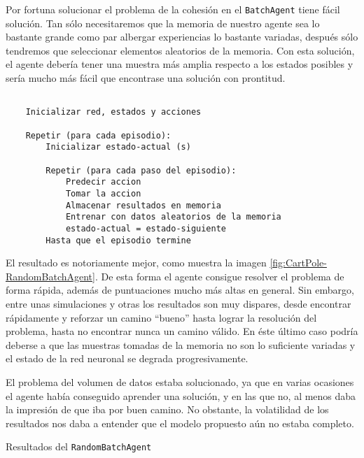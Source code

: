 Por fortuna solucionar el problema de la cohesión en el \texttt{BatchAgent} tiene fácil solución. Tan sólo necesitaremos que la memoria de nuestro agente sea lo bastante grande como par albergar experiencias lo bastante variadas, después sólo tendremos que seleccionar elementos aleatorios de la memoria. Con esta solución, el agente debería tener una muestra más amplia respecto a los estados posibles y sería mucho más fácil que encontrase una solución con prontitud.

\begin{minipage}{0.9\linewidth}%
    \begin{lstlisting}[frame=tb, caption=Pseudocódigo RandomBatchAgent, inputencoding=latin1, label=code:cartpole_drl3]
    
    Inicializar red, estados y acciones
    
    Repetir (para cada episodio):
        Inicializar estado-actual (s)
        
        Repetir (para cada paso del episodio):
            Predecir accion
            Tomar la accion
            Almacenar resultados en memoria
            Entrenar con datos aleatorios de la memoria
            estado-actual = estado-siguiente
        Hasta que el episodio termine
    \end{lstlisting}%
\end{minipage}

El resultado es notoriamente mejor, como muestra la imagen \ref{fig:CartPole-RandomBatchAgent}. De esta forma el agente consigue resolver el problema de forma rápida, además de puntuaciones mucho más altas en general. Sin embargo, entre unas simulaciones y otras los resultados son muy dispares, desde encontrar rápidamente y reforzar un camino ``bueno'' hasta lograr la resolución del problema, hasta no encontrar nunca un camino válido. En éste último caso podría deberse a que las muestras tomadas de la memoria no son lo suficiente variadas y el estado de la red neuronal se degrada progresivamente.

El problema del volumen de datos estaba solucionado, ya que en varias ocasiones el agente había conseguido aprender una solución, y en las que no, al menos daba la impresión de que iba por buen camino. No obstante, la volatilidad de los resultados nos daba a entender que el modelo propuesto aún no estaba completo.

%
       {Resultados del \texttt{RandomBatchAgent}}


